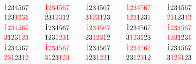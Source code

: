 \[ \SeqCompare{\dot{1}234567}{1\dot{2}3\textcolor{red}{1}\textcolor{red}{\dot{2}}\textcolor{red}{3}1}
\qquad
\SeqCompare{\textcolor{red}{\dot{1}}\textcolor{red}{2}\textcolor{red}{3}\textcolor{red}{4}\textcolor{red}{5}\textcolor{red}{6}\textcolor{red}{7}}{\dot{2}3\textcolor{red}{1}\textcolor{red}{\dot{2}}\textcolor{red}{3}1\dot{2}}
\qquad
\SeqCompare{\dot{1}234567}{3\textcolor{red}{1}\textcolor{red}{\dot{2}}\textcolor{red}{3}1\dot{2}3}
\qquad
\SeqCompare{\textcolor{red}{\dot{1}}\textcolor{red}{2}\textcolor{red}{3}\textcolor{red}{4}\textcolor{red}{5}\textcolor{red}{6}\textcolor{red}{7}}{\textcolor{red}{1}\textcolor{red}{\dot{2}}\textcolor{red}{3}1\dot{2}3\textcolor{red}{1}}
\qquad
\SeqCompare{\dot{1}234567}{\textcolor{red}{\dot{2}}\textcolor{red}{3}1\dot{2}3\textcolor{red}{1}\textcolor{red}{\dot{2}}} \]
\[ \SeqCompare{\textcolor{red}{\dot{1}}\textcolor{red}{2}\textcolor{red}{3}\textcolor{red}{4}\textcolor{red}{5}\textcolor{red}{6}\textcolor{red}{7}}{\textcolor{red}{3}1\dot{2}3\textcolor{red}{1}\textcolor{red}{\dot{2}}\textcolor{red}{3}}
\qquad
\SeqCompare{\dot{1}234567}{1\dot{2}3\textcolor{red}{1}\textcolor{red}{\dot{2}}\textcolor{red}{3}1}
\qquad
\SeqCompare{\textcolor{red}{\dot{1}}\textcolor{red}{2}\textcolor{red}{3}\textcolor{red}{4}\textcolor{red}{5}\textcolor{red}{6}\textcolor{red}{7}}{\dot{2}3\textcolor{red}{1}\textcolor{red}{\dot{2}}\textcolor{red}{3}1\dot{2}}
\qquad
\SeqCompare{\dot{1}234567}{3\textcolor{red}{1}\textcolor{red}{\dot{2}}\textcolor{red}{3}1\dot{2}3}
\qquad
\SeqCompare{\textcolor{red}{\dot{1}}\textcolor{red}{2}\textcolor{red}{3}\textcolor{red}{4}\textcolor{red}{5}\textcolor{red}{6}\textcolor{red}{7}}{\textcolor{red}{1}\textcolor{red}{\dot{2}}\textcolor{red}{3}1\dot{2}3\textcolor{red}{1}} \]
\[ \SeqCompare{\dot{1}234567}{\textcolor{red}{\dot{2}}\textcolor{red}{3}1\dot{2}3\textcolor{red}{1}\textcolor{red}{\dot{2}}}
\qquad
\SeqCompare{\textcolor{red}{\dot{1}}\textcolor{red}{2}\textcolor{red}{3}\textcolor{red}{4}\textcolor{red}{5}\textcolor{red}{6}\textcolor{red}{7}}{\textcolor{red}{3}1\dot{2}3\textcolor{red}{1}\textcolor{red}{\dot{2}}\textcolor{red}{3}}
\qquad
\SeqCompare{\dot{1}234567}{1\dot{2}3\textcolor{red}{1}\textcolor{red}{\dot{2}}\textcolor{red}{3}1}
\qquad
\SeqCompare{\textcolor{red}{\dot{1}}\textcolor{red}{2}\textcolor{red}{3}\textcolor{red}{4}\textcolor{red}{5}\textcolor{red}{6}\textcolor{red}{7}}{\dot{2}3\textcolor{red}{1}\textcolor{red}{\dot{2}}\textcolor{red}{3}1\dot{2}}
\qquad
\SeqCompare{\dot{1}234567}{3\textcolor{red}{1}\textcolor{red}{\dot{2}}\textcolor{red}{3}1\dot{2}3} \]

